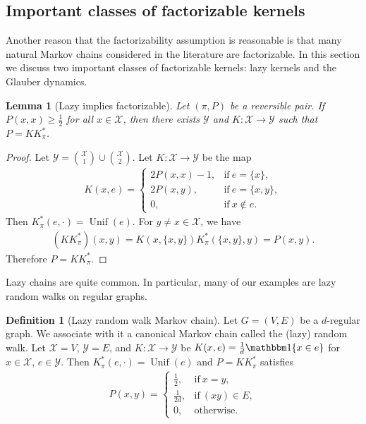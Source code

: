 \documentclass[11pt]{article}
\def\cX{\mathcal{X}}
\def\cY{\mathcal{Y}}
\DeclareMathOperator\Unif{\mathrm{Unif}}
\newtheorem{lemma}[theorem]{Lemma}
\theoremstyle{definition}
\newtheorem{definition}[theorem]{Definition}
\begin{document}
\subsection{Important classes of factorizable kernels}
Another reason that the factorizability assumption is reasonable is that many natural Markov chains considered in the literature are factorizable. In this section we discuss two important classes of factorizable kernels: lazy kernels and the Glauber dynamics.
\begin{lemma}[Lazy implies factorizable] \label{lem:lazy-imply-factor}
  Let $(\pi, P)$ be a reversible pair.
  If $P(x,x) \ge \frac 12$ for all $x\in \cX$, then there exists $\cY$ and $K: \cX \to \cY$ such that $P=KK_\pi^*$.
\end{lemma}
\begin{proof}
  Let $\cY = \binom{\cX}1 \cup \binom{\cX}2$.
  Let $K: \cX \to \cY$ be the map
  \begin{align}
    K(x,e) = \left\{
      \begin{array}{ll}
        2P(x,x)-1, & \text{if}~e=\{x\},\\
        2P(x,y), & \text{if}~e=\{x,y\},\\
        0, & \text{if}~x\not \in e.
      \end{array}
    \right.
  \end{align}
  Then $K_\pi^*(e,\cdot) = \Unif(e)$.
  For $y\ne x\in \cX$, we have
  \begin{align}
    (KK_\pi^*)(x,y) = K(x,\{x,y\}) K_\pi^*(\{x,y\},y) = P(x,y).
  \end{align}
  Therefore $P=KK_\pi^*$.
\end{proof}

Lazy chains are quite common. In particular, many of our examples are lazy random walks on regular graphs.
\begin{definition}[Lazy random walk Markov chain] \label{defn:random-walk-markov-chain}
  Let $G=(V,E)$ be a $d$-regular graph.
  We associate with it a canonical Markov chain called the (lazy) random walk.
  Let $\cX=V$, $\cY=E$, and $K: \cX \to \cY$ be $K(x,e)= \frac 1d \mathbbm1\{x\in e\}$ for $x\in \cX$, $e\in \cY$.
  Then $K_\pi^*(e,\cdot) = \Unif(e)$ and $P=KK_\pi^*$ satisfies
  \begin{align}
    P(x,y) = \left\{
      \begin{array}{ll}
        \frac 12, & \text{if}~x=y,\\
        \frac 1{2d}, & \text{if}~(xy)\in E, \\
        0, & \text{otherwise.}
      \end{array}
    \right.
  \end{align}
\end{definition}
\end{document}
